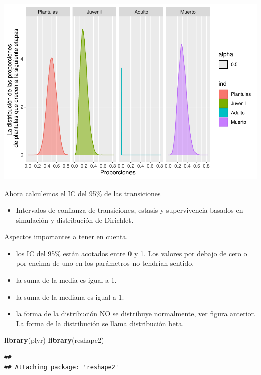 \documentclass[
]{book}
\newenvironment{Shaded}{\begin{snugshade}}{\end{snugshade}}
\newcommand{\FunctionTok}[1]{\textcolor[rgb]{0.13,0.29,0.53}{\textbf{#1}}}
\newcommand{\NormalTok}[1]{#1}
\providecommand{\tightlist}{%
  \setlength{\itemsep}{0pt}\setlength{\parskip}{0pt}}
\theoremstyle{definition}
\theoremstyle{definition}
\theoremstyle{definition}
\theoremstyle{definition}
\theoremstyle{remark}
\begin{document}
\includegraphics{Diagnostico_Poblacional_files/figure-latex/unnamed-chunk-52-1.pdf}

Ahora calculemos el IC del 95\% de las transiciones

\begin{itemize}
\tightlist
\item
  Intervalos de confianza de transiciones, estasis y supervivencia basados en simulación y distribución de Dirichlet.
\end{itemize}

Aspectos importantes a tener en cuenta.

\begin{itemize}
\tightlist
\item
  los IC del 95\% están acotados entre 0 y 1. Los valores por debajo de cero o por encima de uno en los parámetros no tendrían sentido.
\item
  la suma de la media es igual a 1.
\item
  la suma de la mediana es igual a 1.
\item
  la forma de la distribución NO se distribuye normalmente, ver figura anterior. La forma de la distribución se llama distribución beta.
\end{itemize}

\begin{Shaded}
\begin{Highlighting}[]
\FunctionTok{library}\NormalTok{(plyr)}
\FunctionTok{library}\NormalTok{(reshape2)}
\end{Highlighting}
\end{Shaded}

\begin{verbatim}
## 
## Attaching package: 'reshape2'
\end{verbatim}
\end{document}
